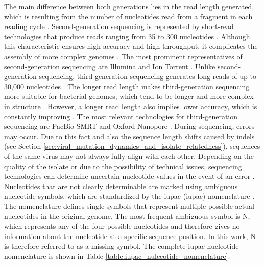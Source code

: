 The main difference between both generations lies in the read length generated, which is resulting from the number of nucleotides read from a fragment in each reading cycle \cite{Ecs1}. Second-generation sequencing is represented by short-read technologies that produce reads ranging from 35 to 300 nucleotides \cite{Lev1}. Although this characteristic ensures high accuracy and high throughput, it complicates the assembly of more complex genomes \cite{Hu1}. The most prominent representatives of second-generation sequencing are Illumina and Ion Torrent \cite{Hu1}. Unlike second-generation sequencing, third-generation sequencing generates long reads of up to 30,000 nucleotides \cite{Sat1}. The longer read length makes third-generation sequencing more suitable for bacterial genomes, which tend to be longer and more complex in structure \cite{Zha1}. However, a longer read length also implies lower accuracy, which is constantly improving \cite{Hu1}. The most relevant technologies for third-generation sequencing are PacBio SMRT and Oxford Nanopore \cite{Hu1}. 
During sequencing, errors may occur. Due to this fact and also the sequence length shifts caused by indels (see Section \ref{sec:viral_mutation_dynamics_and_isolate_relatedness}), sequences of the same virus may not always fully align with each other. Depending on the quality of the isolate or due to the possibility of technical issues, sequencing technologies can determine uncertain nucleotide values in the event of an error \cite{Dav1}. Nucleotides that are not clearly determinable are marked using ambiguous nucleotide symbols, which are standardized by the \acrshort{iupac} (\acrlong{iupac}) nomenclature \cite{Bow1}. The nomenclature defines single symbols that represent multiple possible actual nucleotides in the original genome. The most frequent ambiguous symbol is N, which represents any of the four possible nucleotides and therefore gives no information about the nucleotide at a specific sequence position. In this work, N is therefore referred to as a missing symbol. The complete \acrshort{iupac} nucleotide nomenclature is shown in Table \ref{table:iupac_nulceotide_nomenclature}.

